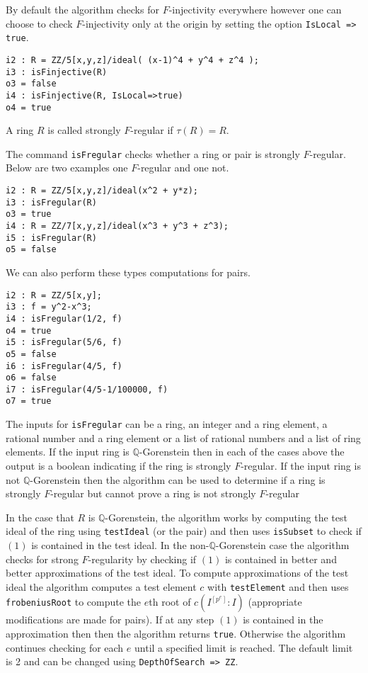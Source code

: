 \documentclass[11pt]{amsart}
\begin{document}
By default the algorithm checks for $F$-injectivity everywhere however one
can choose to check $F$-injectivity only at the origin by setting the
option {\tt IsLocal => true}.

\begin{verbatim}
i2 : R = ZZ/5[x,y,z]/ideal( (x-1)^4 + y^4 + z^4 );
i3 : isFinjective(R)
o3 = false
i4 : isFinjective(R, IsLocal=>true)
o4 = true
\end{verbatim}

\begin{definition}
A ring $R$ is called strongly $F$-regular if $\tau(R) = R$.
\end{definition}


The command {\tt isFregular} checks whether a ring or pair is strongly
$F$-regular. Below are two examples one $F$-regular and one not.


\begin{verbatim}
i2 : R = ZZ/5[x,y,z]/ideal(x^2 + y*z);
i3 : isFregular(R)
o3 = true
i4 : R = ZZ/7[x,y,z]/ideal(x^3 + y^3 + z^3);
i5 : isFregular(R)
o5 = false
\end{verbatim}


We can also perform these types computations for pairs.


\begin{verbatim}
i2 : R = ZZ/5[x,y];
i3 : f = y^2-x^3;
i4 : isFregular(1/2, f)
o4 = true
i5 : isFregular(5/6, f)
o5 = false
i6 : isFregular(4/5, f)
o6 = false
i7 : isFregular(4/5-1/100000, f)
o7 = true
\end{verbatim}


The inputs for {\tt isFregular} can be a ring, an integer and a ring
element, a rational number and a ring element or a list of rational numbers
and a list of ring elements. If the input ring is $\mathbb{Q}$-Gorenstein
then in each of the cases above the output is a boolean indicating if the
ring is strongly $F$-regular. If the input ring is not
$\mathbb{Q}$-Gorenstein then the algorithm can be used to determine if a
ring is strongly $F$-regular but cannot prove a ring is not strongly
$F$-regular


In the case that $R$ is $\mathbb{Q}$-Gorenstein, the algorithm works by
computing the test ideal of the ring using {\tt testIdeal} (or the pair)
and then uses {\tt isSubset} to check if $(1)$ is contained in the test
ideal. In the non-$\mathbb{Q}$-Gorenstein case the algorithm checks for
strong $F$-regularity by checking if $(1)$ is contained in better and
better approximations of the test ideal. To compute approximations of the
test ideal the algorithm computes a test element $c$ with {\tt testElement}
and then uses {\tt frobeniusRoot} to compute the $e$th root of
$c(I^{[p^{e}]} : I)$ (appropriate modifications are made for pairs). If at
any step $(1)$ is contained in the approximation then then the algorithm
returns {\tt true}. Otherwise the algorithm continues checking for each $e$
until a specified limit is reached. The default limit is 2 and can be
changed using {\tt DepthOfSearch => ZZ}.
\end{document}
